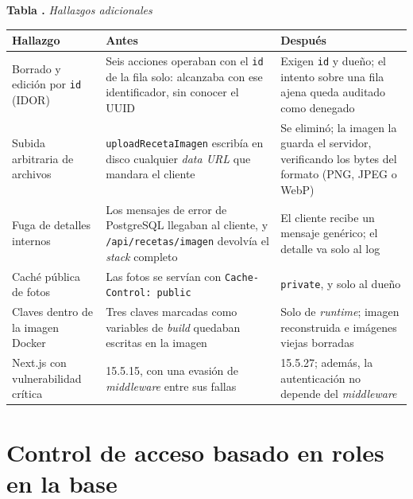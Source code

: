 \documentclass[11pt,letterpaper]{article}
\newcommand{\cod}[1]{\texttt{#1}}
\newcounter{tablaapa}
\newcommand{\tablaAPA}[2]{\refstepcounter{tablaapa}\label{#1}%
  \noindent\textbf{Tabla \thetablaapa.} \textit{#2}\par\vspace{0.15cm}}
\begin{document}
\vspace{4pt}
\par\noindent\begin{minipage}{\linewidth}
\tablaAPA{tab:extra}{Hallazgos adicionales}
\noindent
\renewcommand{\arraystretch}{1.2}
\begin{tabularx}{\linewidth}{@{}P{3.6cm}>{\raggedright\arraybackslash\small}X>{\raggedright\arraybackslash\small}X@{}}
\toprule
\textbf{Hallazgo} & \textbf{\color{antes}Antes} & \textbf{\color{despues}Después} \\
\midrule
Borrado y edición por \cod{id} (IDOR) & Seis acciones operaban con el \cod{id} de la fila solo: alcanzaba con ese identificador, sin conocer el UUID & Exigen \cod{id} y dueño; el intento sobre una fila ajena queda auditado como denegado \\
Subida arbitraria de archivos & \cod{uploadRecetaImagen} escribía en disco cualquier \textit{data URL} que mandara el cliente & Se eliminó; la imagen la guarda el servidor, verificando los bytes del formato (PNG, JPEG o WebP) \\
Fuga de detalles internos & Los mensajes de error de PostgreSQL llegaban al cliente, y \cod{/api/recetas/imagen} devolvía el \textit{stack} completo & El cliente recibe un mensaje genérico; el detalle va solo al log \\
Caché pública de fotos & Las fotos se servían con \cod{Cache-Control: public} & \cod{private}, y solo al dueño \\
Claves dentro de la imagen Docker & Tres claves marcadas como variables de \textit{build} quedaban escritas en la imagen & Solo de \textit{runtime}; imagen reconstruida e imágenes viejas borradas \\
Next.js con vulnerabilidad crítica & 15.5.15, con una evasión de \textit{middleware} entre sus fallas & 15.5.27; además, la autenticación no depende del \textit{middleware} \\
\bottomrule
\end{tabularx}
\end{minipage}\par\vspace{6pt}

\section{Control de acceso basado en roles en la base}
\end{document}
